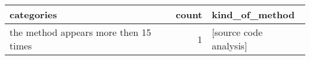 \begin{tabular}{lrl}
\toprule
                            categories &  count &                                                                                                                                                                                                                                                                                                                                                                                                                                                                                                                                                                                                                                                                                                                                                                                                                                                                                                                                                                                                                                                                                                                                                                                                                                                                                                                                                                                                                                                                                                                      kind\_of\_method \\
\midrule
 the method appears more then 15 times &      1 &                                                                                                                                                                                                                                                                                                                                                                                                                                                                                                                                                                                                                                                                                                                                                                                                                                                                                                                                                                                                                                                                                                                                                                                                                                                                                                                                                                                                                                                                                                              [source code analysis] \\

\end{tabular}
